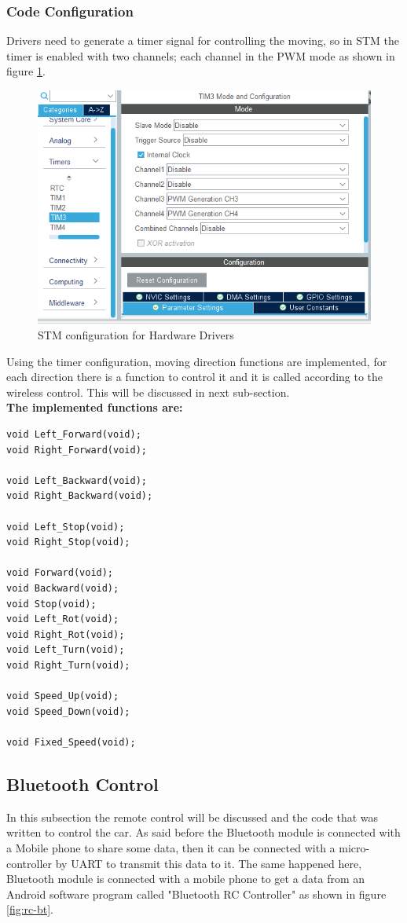 \subsubsection{Code Configuration}
Drivers need to generate a timer signal for controlling the moving, so in STM the timer is enabled with two channels; each channel in the PWM mode as shown in figure \ref{fig:stm-config}.
\newpage
\begin{figure}[h]
    \centering
    \includegraphics[width=.8\textwidth]{figures/9_14.PNG}
    \caption{STM configuration for Hardware Drivers}
    \label{fig:stm-config}
\end{figure}
Using the timer configuration, moving direction functions are implemented, for each direction there is a function to control it and it is called according to the wireless control. This will be discussed in next sub-section.
\\ \textbf{The implemented functions are:}
\begin{lstlisting}
void Left_Forward(void);
void Right_Forward(void);

void Left_Backward(void);
void Right_Backward(void);

void Left_Stop(void);
void Right_Stop(void);

void Forward(void);
void Backward(void);
void Stop(void);
void Left_Rot(void);
void Right_Rot(void);
void Left_Turn(void);
void Right_Turn(void);

void Speed_Up(void);
void Speed_Down(void);

void Fixed_Speed(void);
\end{lstlisting}
\subsection{Bluetooth Control}
In this subsection the remote control will be discussed and the code that was written to control the car. As said before the Bluetooth module is connected with a Mobile phone to share some data, then it can be connected with a micro-controller by UART to transmit this data to it. The same happened here, Bluetooth module is connected with a mobile phone to get a data from an Android software program called "Bluetooth RC Controller" as shown in figure \ref{fig:rc-bt}.

